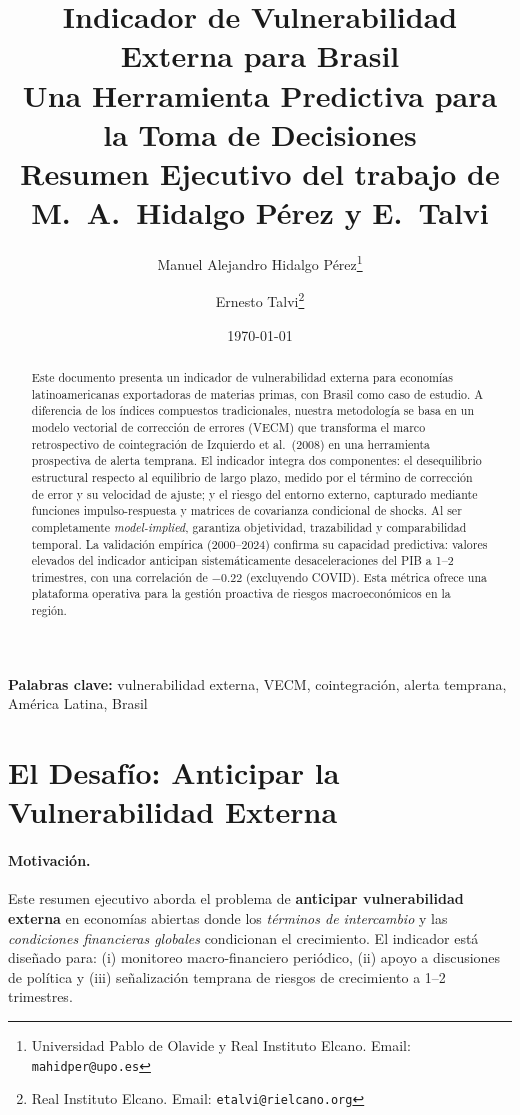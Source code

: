 \documentclass[11pt,a4paper]{article}
\title{
  \vspace{1cm}
  \LARGE{\textbf{Indicador de Vulnerabilidad Externa para Brasil}}\\
  \large{Una Herramienta Predictiva para la Toma de Decisiones}\\[0.5cm]
  \normalsize{Resumen Ejecutivo del trabajo de M.\ A.\ Hidalgo Pérez y E.\ Talvi}
}
\author{
  Manuel Alejandro Hidalgo Pérez\thanks{Universidad Pablo de Olavide y Real Instituto Elcano. Email: \texttt{mahidper@upo.es}} 
  \and 
  Ernesto Talvi\thanks{Real Instituto Elcano. Email: \texttt{etalvi@rielcano.org}}
}
\date{\today} %
\numberwithin{equation}{section}
\begin{document}
\maketitle
\thispagestyle{empty}

\begin{abstract}
\noindent
Este documento presenta un indicador de vulnerabilidad externa para economías latinoamericanas exportadoras de materias primas, con Brasil como caso de estudio. A diferencia de los índices compuestos tradicionales, nuestra metodología se basa en un modelo vectorial de corrección de errores (VECM) que transforma el marco retrospectivo de cointegración de Izquierdo et al.\ (2008) en una herramienta prospectiva de alerta temprana. El indicador integra dos componentes: el desequilibrio estructural respecto al equilibrio de largo plazo, medido por el término de corrección de error y su velocidad de ajuste; y el riesgo del entorno externo, capturado mediante funciones impulso-respuesta y matrices de covarianza condicional de shocks. Al ser completamente \emph{model-implied}, garantiza objetividad, trazabilidad y comparabilidad temporal. La validación empírica (2000--2024) confirma su capacidad predictiva: valores elevados del indicador anticipan sistemáticamente desaceleraciones del PIB a 1--2 trimestres, con una correlación de $-0.22$ (excluyendo COVID). Esta métrica ofrece una plataforma operativa para la gestión proactiva de riesgos macroeconómicos en la región.
\end{abstract}

\vspace{0.5cm}

\noindent\textbf{Palabras clave:} vulnerabilidad externa, VECM, cointegración, alerta temprana, América Latina, Brasil

\clearpage



\section{El Desafío: Anticipar la Vulnerabilidad Externa}

\paragraph{Motivación.}
Este resumen ejecutivo aborda el problema de \textbf{anticipar vulnerabilidad externa} en economías abiertas donde los \emph{términos de intercambio} y las \emph{condiciones financieras globales} condicionan el crecimiento. El indicador está diseñado para: (i) monitoreo macro-financiero periódico, (ii) apoyo a discusiones de política y (iii) señalización temprana de riesgos de crecimiento a 1--2 trimestres.
\end{document}
